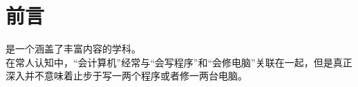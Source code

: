 \chapter*{前言}\label{ch:preface}
    \cst 是一个涵盖了丰富内容的学科。\\
    在常人认知中，“会计算机”经常与“会写程序”和“会修电脑”关联在一起，但是真正深入\cst 并不意味着止步于写一两个程序或者修一两台电脑。
